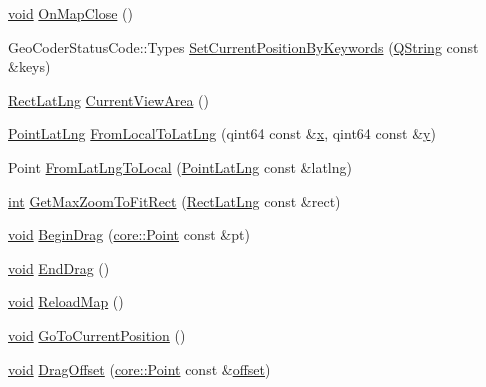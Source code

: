 \begin{DoxyCompactItemize}
\item 
\hyperlink{group___u_a_v_objects_plugin_ga444cf2ff3f0ecbe028adce838d373f5c}{void} \hyperlink{group___o_p_map_widget_ga10820264fc94dee4c279f60f6ed02309}{On\-Map\-Close} ()
\item 
Geo\-Coder\-Status\-Code\-::\-Types \hyperlink{group___o_p_map_widget_ga6fbdb5c07fae2a4400184e0c621ad750}{Set\-Current\-Position\-By\-Keywords} (\hyperlink{group___u_a_v_objects_plugin_gab9d252f49c333c94a72f97ce3105a32d}{Q\-String} const \&keys)
\item 
\hyperlink{structinternals_1_1_rect_lat_lng}{Rect\-Lat\-Lng} \hyperlink{group___o_p_map_widget_ga228af41d307f46e0d759a52f0305d39a}{Current\-View\-Area} ()
\item 
\hyperlink{structinternals_1_1_point_lat_lng}{Point\-Lat\-Lng} \hyperlink{group___o_p_map_widget_gad6344ac56cefc8976c5bdf521b337a2f}{From\-Local\-To\-Lat\-Lng} (qint64 const \&\hyperlink{glext_8h_a1db9d104e3c2128177f26aff7b46982f}{x}, qint64 const \&\hyperlink{glext_8h_a42315f3ed8fff752bb47fd782309fcfc}{y})
\item 
Point \hyperlink{group___o_p_map_widget_ga8a2cc04c6bd69c306eaebe3df205f919}{From\-Lat\-Lng\-To\-Local} (\hyperlink{structinternals_1_1_point_lat_lng}{Point\-Lat\-Lng} const \&latlng)
\item 
\hyperlink{ioapi_8h_a787fa3cf048117ba7123753c1e74fcd6}{int} \hyperlink{group___o_p_map_widget_gaa75d239e869570eef0224e4e5654bd75}{Get\-Max\-Zoom\-To\-Fit\-Rect} (\hyperlink{structinternals_1_1_rect_lat_lng}{Rect\-Lat\-Lng} const \&rect)
\item 
\hyperlink{group___u_a_v_objects_plugin_ga444cf2ff3f0ecbe028adce838d373f5c}{void} \hyperlink{group___o_p_map_widget_ga1255054a69438d905b49b903627aef03}{Begin\-Drag} (\hyperlink{structcore_1_1_point}{core\-::\-Point} const \&pt)
\item 
\hyperlink{group___u_a_v_objects_plugin_ga444cf2ff3f0ecbe028adce838d373f5c}{void} \hyperlink{group___o_p_map_widget_ga47086f4344e201cc216384fb3acec854}{End\-Drag} ()
\item 
\hyperlink{group___u_a_v_objects_plugin_ga444cf2ff3f0ecbe028adce838d373f5c}{void} \hyperlink{group___o_p_map_widget_ga0ca3f365c1668226a6788084d56a6c1d}{Reload\-Map} ()
\item 
\hyperlink{group___u_a_v_objects_plugin_ga444cf2ff3f0ecbe028adce838d373f5c}{void} \hyperlink{group___o_p_map_widget_ga868496601dff669c0a6844a27f41e5c7}{Go\-To\-Current\-Position} ()
\item 
\hyperlink{group___u_a_v_objects_plugin_ga444cf2ff3f0ecbe028adce838d373f5c}{void} \hyperlink{group___o_p_map_widget_ga87303856077d440b36aa4b53a5103d64}{Drag\-Offset} (\hyperlink{structcore_1_1_point}{core\-::\-Point} const \&\hyperlink{glext_8h_ae1b92ae085ddef4b1cdca7d749339fb0}{offset})

\end{DoxyCompactItemize}
